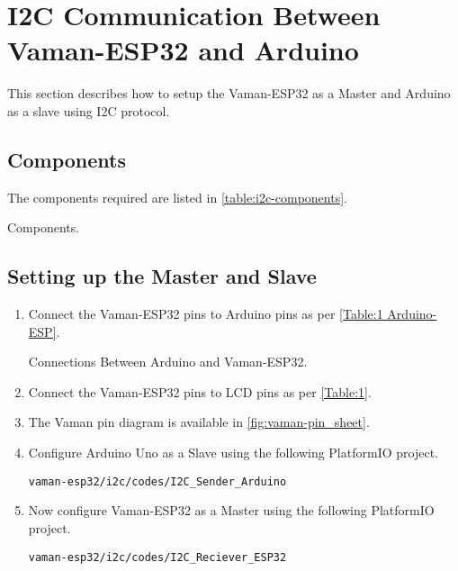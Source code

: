 \section{I2C Communication Between Vaman-ESP32 and Arduino}
This section describes how to setup the Vaman-ESP32 as a Master and Arduino as a
slave using I2C protocol.
\subsection{Components}
The components required are listed in \autoref{table:i2c-components}.
\begin{table}[!ht]
\centering

\caption{Components.}
\label{table:i2c-components}
\end{table}

\subsection{Setting up the Master and Slave}
\begin{enumerate}
\item Connect the Vaman-ESP32 pins to Arduino pins as per \autoref{Table:1
Arduino-ESP}.
\begin{table}[!ht]
\centering

\caption{Connections Between Arduino and Vaman-ESP32.}
\label{Table:1 Arduino-ESP}
\end{table}

\item Connect the Vaman-ESP32 pins to LCD pins as per \autoref{Table:1}.

\item The Vaman pin diagram is available in \autoref{fig:vaman-pin_sheet}.

\item Configure Arduino Uno as a Slave using the following PlatformIO project.
\begin{lstlisting}
vaman-esp32/i2c/codes/I2C_Sender_Arduino
\end{lstlisting}
\item
Now configure Vaman-ESP32 as a Master using the following PlatformIO project.
\begin{lstlisting}
vaman-esp32/i2c/codes/I2C_Reciever_ESP32
\end{lstlisting}

\end{enumerate}